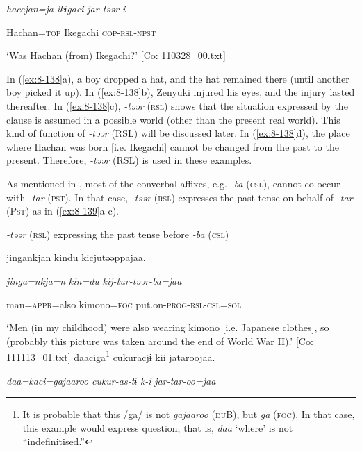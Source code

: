       \textit{haccjan=ja}  \textit{ikɨgaci}  \textit{jar-təər{}-i}

      Hachan=\textsc{top}  Ikegachi  \textsc{cop}-\textsc{rsl}-\textsc{npst}

\glt ‘Was Hachan (from) Ikegachi?’ [Co: 110328\_00.txt]
\z

In (\ref{ex:8-138}a), a boy dropped a hat, and the hat remained there (until another boy picked it up). In (\ref{ex:8-138}b), Zenyuki injured his eyes, and the injury lasted thereafter. In (\ref{ex:8-138}c), \textit{{}-təər} (\textsc{rsl}) shows that the situation expressed by the clause is assumed in a possible world (other than the present real world). This kind of function of \textit{{}-təər} (RSL) will be discussed later. In (\ref{ex:8-138}d), the place where Hachan was born [i.e. Ikegachi] cannot be changed from the past to the present. Therefore, \textit{-təər} (RSL) is used in these examples.

  As mentioned in , most of the converbal affixes, e.g. \textit{{}-ba} (\textsc{csl}), cannot co-occur with \textit{{}-tar} (\textsc{pst}). In that case, \textit{{}-təər} (\textsc{rsl}) expresses the past tense on behalf of \textit{{}-tar} (P\textsc{st}) as in (\ref{ex:8-139}a-c).

\ea\label{ex:8-139}
  \textit{{}-təər} (\textsc{rsl}) expressing the past tense before \textit{{}-ba} (\textsc{csl})


    {\TM}
\glll  jingankjan  kindu  kicjutəəppajaa.

      \textit{jinga=nkja=n}  \textit{kin=du}  \textit{kij-tur-təər-ba=jaa}

      man=\textsc{appr}=also  kimono=\textsc{foc}  put.on-\textsc{prog}-\textsc{rsl}-\textsc{csl}=\textsc{sol}

\glt ‘Men (in my childhood) were also wearing kimono [i.e. Japanese clothes], so (probably this picture was taken around the end of World War II).’ [Co: 111113\_01.txt]
\ex {\TM}
\glll  daaciga\footnote{It is probable that this /ga/ is not \textit{gajaaroo} (\textsc{du}B), but \textit{ga} (\textsc{foc}). In that case, this example would express question; that is, \textit{daa} ‘where’ is not “indefinitised.”}  cukuracjɨ  kii  jataroojaa.

      \textit{daa=kaci=gajaaroo}  \textit{cukur-as-tɨ}  \textit{k-i}  \textit{jar-tar-oo=jaa}

